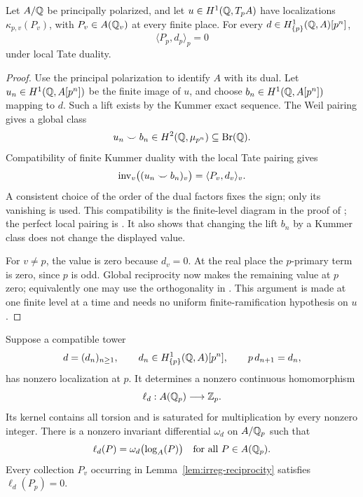 \begin{lemma}\label{lem:irreg-reciprocity}
Let \(A/\mathbb Q\) be principally polarized, and let
\(u\in H^1(\mathbb Q,T_pA)\) have localizations
\(\kappa_{p,v}(P_v)\), with \(P_v\in A(\mathbb Q_v)\) at every finite place.
For every
\(d\in H^1_{\{p\}}(\mathbb Q,A)[p^n]\),
\begin{equation}
 \langle P_p,d_p\rangle_p=0
 \label{eq:irreg-supported-pairing}
\end{equation}
under local Tate duality.
\end{lemma}

\begin{proof}
Use the principal polarization to identify \(A\) with its dual.
Let \(u_n\in H^1(\mathbb Q,A[p^n])\) be the finite image of \(u\), and choose
\(b_n\in H^1(\mathbb Q,A[p^n])\) mapping to \(d\). Such a lift exists by
the Kummer exact sequence. The Weil pairing gives a global class
\[
 u_n\smile b_n\in H^2(\mathbb Q,\mu_{p^n})
                 \subseteq\operatorname{Br}(\mathbb Q).
\]
Compatibility of finite Kummer duality with the local Tate pairing
gives
\[
 \operatorname{inv}_v\bigl((u_n\smile b_n)_v\bigr)
     =\langle P_v,d_v\rangle_v.
\]
A consistent choice of the order of the dual factors fixes the sign;
only its vanishing is used. This compatibility is the finite-level
diagram in the proof of
\cite[I, Theorem 3.2, pp.~41--43]{Milne2006ADT};
the perfect local pairing is
\cite[I, Corollary 3.4, pp.~43--44]{Milne2006ADT}.
It also shows that changing the lift \(b_n\) by a Kummer class does
not change the displayed value.

For \(v\neq p\), the value is zero because \(d_v=0\). At the real
place the \(p\)-primary term is zero, since \(p\) is odd.
Global reciprocity now makes the remaining value at \(p\) zero;
equivalently one may use the orthogonality in
\cite[I, Theorem 4.10(b), pp.~56--57]{Milne2006ADT}.
This argument is made at one finite level at a time and needs no
uniform finite-ramification hypothesis on \(u\).
\end{proof}

\begin{lemma}\label{lem:irreg-tower-functional}
Suppose a compatible tower
\begin{equation}
 d=(d_n)_{n\geq1},\qquad
 d_n\in H^1_{\{p\}}(\mathbb Q,A)[p^n],\qquad
 p\,d_{n+1}=d_n,
 \label{eq:irreg-tower}
\end{equation}
has nonzero localization at \(p\). It determines a nonzero
continuous homomorphism
\begin{equation}
 \ell_d:A(\mathbb Q_p)\longrightarrow\mathbb Z_p.
 \label{eq:irreg-integral-functional}
\end{equation}
Its kernel contains all torsion and is saturated for multiplication
by every nonzero integer. There is a nonzero invariant differential
\(\omega_d\) on \(A/\mathbb Q_p\) such that
\begin{equation}
 \ell_d(P)=\omega_d\bigl(\log_A(P)\bigr)
 \quad\text{for all }P\in A(\mathbb Q_p).
 \label{eq:irreg-log-functional}
\end{equation}
Every collection \(P_v\) occurring in
Lemma~\ref{lem:irreg-reciprocity} satisfies \(\ell_d(P_p)=0\).
\end{lemma}


